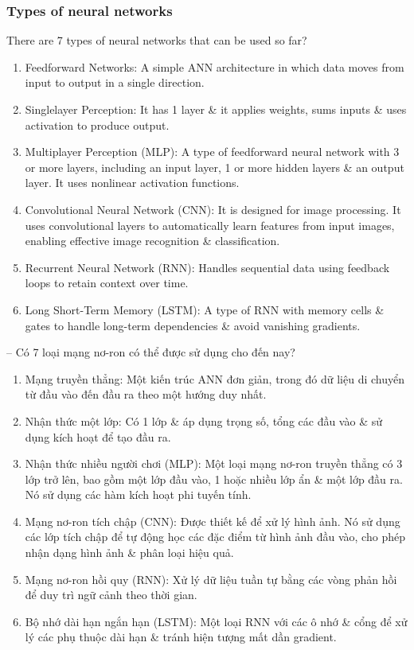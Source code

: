 \documentclass{article}
\begin{document}

\subsubsection{Types of neural networks}
There are 7 types of neural networks that can be used so far?
\begin{enumerate}
    \item Feedforward Networks: A simple ANN architecture in which data moves from input to output in a single direction.
    \item Singlelayer Perception: It has 1 layer \& it applies weights, sums inputs \& uses activation to produce output.
    \item Multiplayer Perception (MLP): A type of feedforward neural network with 3 or more layers, including an input layer, 1 or more hidden layers \& an output layer. It uses nonlinear activation functions.
    \item Convolutional Neural Network (CNN): It is designed for image processing. It uses convolutional layers to automatically learn features from input images, enabling effective image recognition \& classification.
    \item Recurrent Neural Network (RNN): Handles sequential data using feedback loops to retain context over time.
    \item Long Short-Term Memory (LSTM): A type of RNN with memory cells \& gates to handle long-term dependencies \& avoid vanishing gradients.
\end{enumerate}
-- Có 7 loại mạng nơ-ron có thể được sử dụng cho đến nay?
\begin{enumerate}
    \item Mạng truyền thẳng: Một kiến trúc ANN đơn giản, trong đó dữ liệu di chuyển từ đầu vào đến đầu ra theo một hướng duy nhất.
    \item Nhận thức một lớp: Có 1 lớp \& áp dụng trọng số, tổng các đầu vào \& sử dụng kích hoạt để tạo đầu ra.
    \item Nhận thức nhiều người chơi (MLP): Một loại mạng nơ-ron truyền thẳng có 3 lớp trở lên, bao gồm một lớp đầu vào, 1 hoặc nhiều lớp ẩn \& một lớp đầu ra. Nó sử dụng các hàm kích hoạt phi tuyến tính.
    \item Mạng nơ-ron tích chập (CNN): Được thiết kế để xử lý hình ảnh. Nó sử dụng các lớp tích chập để tự động học các đặc điểm từ hình ảnh đầu vào, cho phép nhận dạng hình ảnh \& phân loại hiệu quả.
    \item Mạng nơ-ron hồi quy (RNN): Xử lý dữ liệu tuần tự bằng các vòng phản hồi để duy trì ngữ cảnh theo thời gian.

    \item Bộ nhớ dài hạn ngắn hạn (LSTM): Một loại RNN với các ô nhớ \& cổng để xử lý các phụ thuộc dài hạn \& tránh hiện tượng mất dần gradient.
\end{enumerate}
\end{document}
